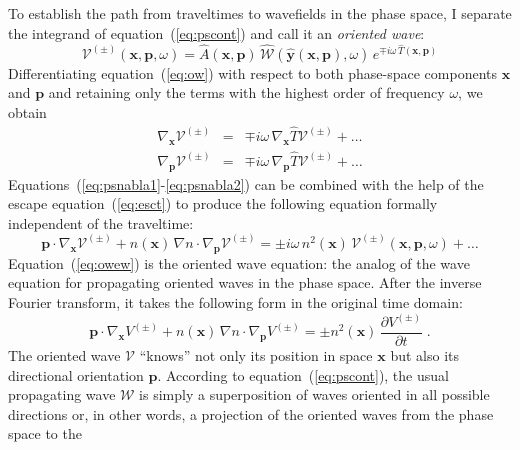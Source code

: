 To establish the path from traveltimes to wavefields in the phase space, I
separate the integrand of equation~(\ref{eq:pscont}) and call it an
\emph{oriented wave}:
\begin{equation}
\label{eq:ow}
\mathcal{V}^{(\pm)}(\mathbf{x},\mathbf{p},\omega) = 
  \widehat{A}(\mathbf{x},\mathbf{p})\,
  \widehat{\mathcal{W}}\left(\widehat{\mathbf{y}}(\mathbf{x},\mathbf{p}),
  \omega\right)\,e^{\mp i \omega\,\widehat{T}(\mathbf{x},\mathbf{p})}
\end{equation}
Differentiating equation~(\ref{eq:ow}) with respect to both phase-space
components $\mathbf{x}$ and $\mathbf{p}$ and retaining only the terms with the
highest order of frequency $\omega$, we obtain 
\begin{eqnarray}
  \label{eq:psnabla1}
  \nabla_{\mathbf{x}} \mathcal{V}^{(\pm)} & = & 
  \mp i \omega\,\nabla_{\mathbf{x}} \widehat{T} \mathcal{V}^{(\pm)} + \ldots
  \\
  \label{eq:psnabla2}
  \nabla_{\mathbf{p}} \mathcal{V}^{(\pm)} & = & 
  \mp i \omega\,\nabla_{\mathbf{p}} \widehat{T} \mathcal{V}^{(\pm)} + \ldots 
\end{eqnarray}
Equations~(\ref{eq:psnabla1}-\ref{eq:psnabla2}) can be combined with the help
of the escape equation~(\ref{eq:esct}) to produce the following equation
formally independent of the traveltime:
\begin{equation}
  \label{eq:owew}
  \mathbf{p} \cdot \nabla_{\mathbf{x}} \mathcal{V}^{(\pm)} +
  n(\mathbf{x})\,\nabla n \cdot \nabla_{\mathbf{p}} \mathcal{V}^{(\pm)}
  = \pm i \omega\,n^2(\mathbf{x})\,
\mathcal{V}^{(\pm)}(\mathbf{x},\mathbf{p},\omega) + \ldots
\end{equation}
Equation~(\ref{eq:owew}) is the oriented wave equation: the analog of the wave
equation for propagating oriented waves in the phase space. After the inverse
Fourier transform, it takes the following form in the original time domain:
\begin{equation}
  \label{eq:owe}
  \boxed{
\mathbf{p} \cdot \nabla_{\mathbf{x}} V^{(\pm)} +
  n(\mathbf{x})\,\nabla n \cdot \nabla_{\mathbf{p}} V^{(\pm)} 
  = \pm n^2(\mathbf{x})\,\frac{\partial V^{(\pm)}}{\partial t}\;.}
\end{equation}
The oriented wave $\mathcal{V}$ ``knows'' not only its position in space
$\mathbf{x}$ but also its directional orientation $\mathbf{p}$. According to
equation~(\ref{eq:pscont}), the usual propagating wave $\mathcal{W}$ is simply
a superposition of waves oriented in all possible directions or, in other
words, a projection of the oriented waves from the phase space to the
